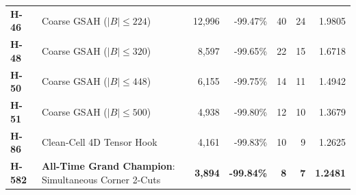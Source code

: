 \begin{table}[t]
\begin{tabular}{llrrrrr}
\textbf{H-46} & Coarse GSAH ($|B| \le 224$) & 12,996 & -99.47\% & 40 & 24 & 1.9805 \\
\textbf{H-48} & Coarse GSAH ($|B| \le 320$) & 8,597 & -99.65\% & 22 & 15 & 1.6718 \\
\textbf{H-50} & Coarse GSAH ($|B| \le 448$) & 6,155 & -99.75\% & 14 & 11 & 1.4942 \\
\textbf{H-51} & Coarse GSAH ($|B| \le 500$) & 4,938 & -99.80\% & 12 & 10 & 1.3679 \\
\textbf{H-86} & Clean-Cell 4D Tensor Hook & 4,161 & -99.83\% & 10 & 9 & 1.2625 \\
\textbf{H-582} & \textbf{All-Time Grand Champion}: Simultaneous Corner 2-Cuts & \textbf{3,894} & \textbf{-99.84\%} & \textbf{8} & \textbf{7} & \textbf{1.2481} \\
\bottomrule
\end{tabular}
\end{table}
